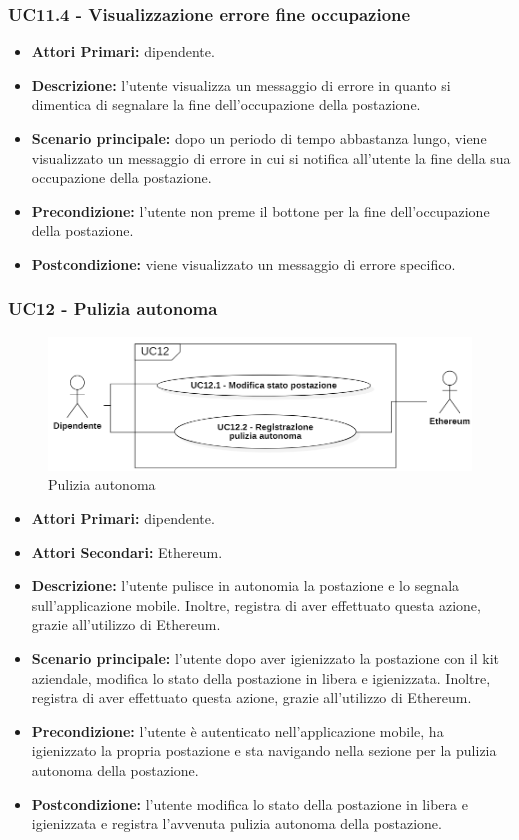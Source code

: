 \subsubsection{ UC11.4 - Visualizzazione errore fine occupazione}
\begin{itemize}
	\item\textbf{Attori Primari:} dipendente.
	\item\textbf{Descrizione:} l’utente visualizza un messaggio di errore in quanto si dimentica di segnalare la fine dell'occupazione della postazione.
	\item\textbf{Scenario principale:} dopo un periodo di tempo abbastanza lungo, viene visualizzato un messaggio di errore in cui si notifica
	all'utente la fine della sua occupazione della postazione.
	\item\textbf{Precondizione:} l’utente non preme il bottone per la fine dell'occupazione della postazione.
	\item\textbf{Postcondizione:} viene visualizzato un messaggio di errore specifico.
\end{itemize}
\subsubsection{ UC12 - Pulizia autonoma}
\begin{figure}[H]
	\centering
	\includegraphics[width=15cm]{res/images/UC12.png}
	\caption{Pulizia autonoma}
	\label{fig:Pulizia autonoma}
\end{figure}
\begin{itemize}
	\item\textbf{Attori Primari:} dipendente.
	\item\textbf{Attori Secondari:} Ethereum.
	\item\textbf{Descrizione:} l’utente pulisce in autonomia la postazione e lo segnala sull'applicazione mobile. Inoltre, 
	registra di aver effettuato questa azione, grazie all'utilizzo di Ethereum.	\item\textbf{Scenario principale:} l’utente dopo aver igienizzato la postazione con il kit aziendale, modifica lo stato della postazione in libera e igienizzata. Inoltre, 
	registra di aver effettuato questa azione, grazie all'utilizzo di Ethereum.
	\item\textbf{Precondizione:} l’utente è autenticato nell'applicazione mobile, ha igienizzato la propria postazione e sta navigando nella sezione per la pulizia 
	autonoma della postazione.
	\item\textbf{Postcondizione:} l’utente modifica lo stato della postazione in libera e igienizzata e registra l'avvenuta pulizia autonoma della postazione.
\end{itemize}
